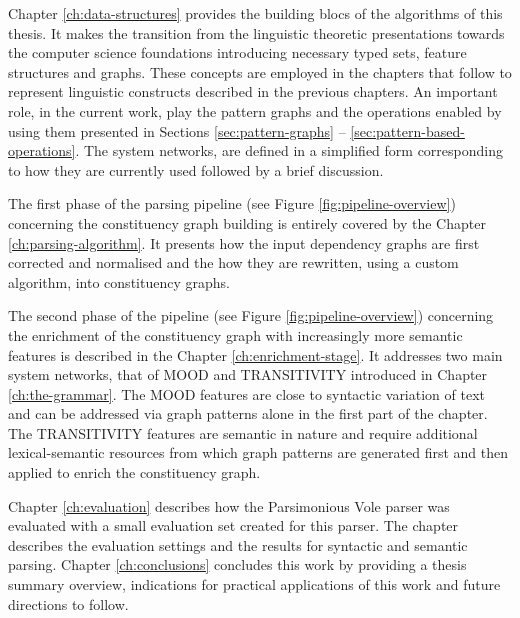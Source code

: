 Chapter \ref{ch:data-structures} provides the building blocs of the algorithms of this thesis. It makes the transition from the linguistic theoretic presentations towards the computer science foundations introducing necessary typed sets, feature structures and graphs. These concepts are employed in the chapters that follow to represent linguistic constructs described in the previous chapters. An important role, in the current work, play the pattern graphs and the operations enabled by using them presented in Sections \ref{sec:pattern-graphs} -- \ref{sec:pattern-based-operations}. The system networks, are defined in a simplified form corresponding to how they are currently used followed by a brief discussion.

The first phase of the parsing pipeline (see Figure \ref{fig:pipeline-overview}) concerning the constituency graph building is entirely covered by the Chapter \ref{ch:parsing-algorithm}. It presents how the input dependency graphs are first corrected and normalised and the how they are rewritten, using a custom algorithm, into constituency graphs. 

The second phase of the pipeline (see Figure \ref{fig:pipeline-overview}) concerning the enrichment of the  constituency graph with increasingly more semantic features is described in the Chapter \ref{ch:enrichment-stage}. It addresses two main system networks, that of MOOD and TRANSITIVITY introduced in Chapter \ref{ch:the-grammar}. The MOOD features are close to syntactic variation of text and can be addressed via graph patterns alone in the first part of the chapter. The TRANSITIVITY features are semantic in nature and require additional lexical-semantic resources from which graph patterns are generated first and then applied to enrich the constituency graph.

Chapter \ref{ch:evaluation} describes how the Parsimonious Vole parser was evaluated with a small evaluation set created for this parser. The chapter describes the evaluation settings and the results for syntactic and semantic parsing. Chapter \ref{ch:conclusions} concludes this work by providing a thesis summary overview, indications for practical applications of this work and future directions to follow. 


